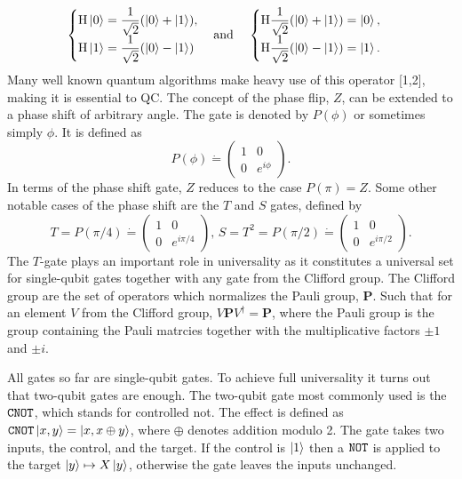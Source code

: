 \begin{equation}
\begin{cases}
\text{H}\ket{0} = \dfrac{1}{\sqrt{2}}(\ket{0} + \ket{1}),
\\
\text{H}\ket{1} = \dfrac{1}{\sqrt{2}}(\ket{0} - \ket{1})
\end{cases}
\text{and}\hspace{4mm}
\begin{cases}
\text{H}\dfrac{1}{\sqrt{2}}(\ket{0} + \ket{1}) = \ket{0},
\\
\text{H}\dfrac{1}{\sqrt{2}}(\ket{0} - \ket{1}) = \ket{1}.
\end{cases}
\end{equation}
Many well known quantum algorithms make heavy use of this operator [1,2], making it is essential to QC.
The concept of the phase flip, $Z$, can be extended to a phase shift of arbitrary angle. The gate is denoted by $P(\phi)$ or sometimes simply $\phi$. It is defined as 
\begin{equation}
P(\phi) \dot{=} \begin{pmatrix}
1 & 0 \\
0 & e^{i\phi}
\end{pmatrix}.
\end{equation}
In terms of the phase shift gate, $Z$ reduces to the case $P(\pi) = Z$. Some other notable cases of the phase shift are the $T$ and $S$ gates, defined by
\begin{equation}
T = P({\pi/4}) \dot{=} \begin{pmatrix}
1 & 0 \\ 0 & e^{i\pi/4}
\end{pmatrix},\, S = T^2 = P({\pi/2}) \dot{=} \begin{pmatrix}
1 & 0 \\ 0 & e^{i\pi/2}
\end{pmatrix}.
\end{equation}
The $T$-gate plays an important role in universality as it constitutes a universal set for single-qubit gates together with any gate from the Clifford group. The Clifford group are the set of operators which normalizes the Pauli group, $\mathbf{P}$. Such that for an element $V$ from the Clifford group, $V\mathbf{P}V^\dagger =\mathbf{P}$, where the Pauli group is the group containing the Pauli matrcies together with the multiplicative factors $\pm 1$ and $\pm i$. 

All gates so far are single-qubit gates. To achieve full universality it turns out that two-qubit gates are enough. The two-qubit gate most commonly used is the ${\tt CNOT}$, which stands for controlled not. The effect is defined as ${\tt CNOT}\ket{x,y} = \ket{x,x\oplus y}$, where $\oplus$ denotes addition modulo 2. The gate takes two inputs, the control, and the target. If the control is $\ket{1}$ then a ${\tt NOT}$ is applied to the target $\ket{y} \mapsto X\ket{y}$, otherwise the gate leaves the inputs unchanged.



